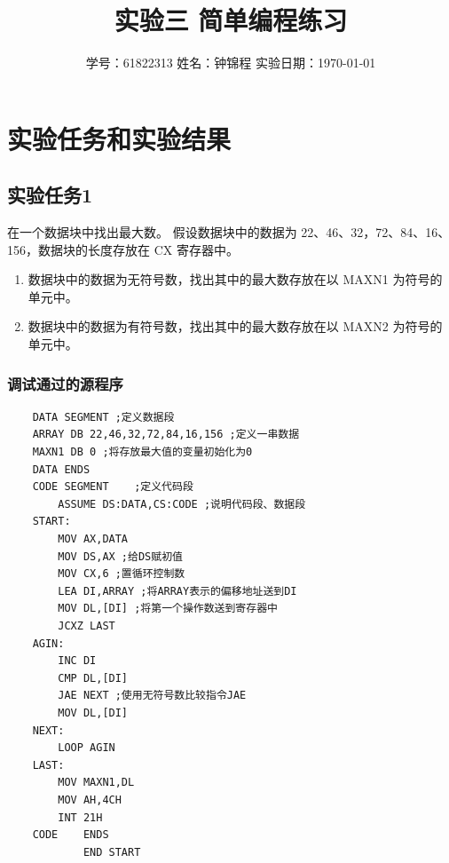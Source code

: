 \documentclass[12pt, a4paper, oneside]{ctexart}
\title{实验三 \qquad  简单编程练习}
\author{学号：61822313 \qquad 姓名：钟锦程 \qquad 实验日期：\today}
\date{}
\begin{document}
\maketitle
\section{实验任务和实验结果}
\subsection{实验任务1}
在一个数据块中找出最大数。 
假设数据块中的数据为 22、46、32，72、84、16、156，数据块的长度存放在 CX 寄存器中。
\begin{enumerate}
    \item 数据块中的数据为无符号数，找出其中的最大数存放在以 MAXN1 为符号的单元中。
    \item 数据块中的数据为有符号数，找出其中的最大数存放在以 MAXN2 为符号的单元中。 
\end{enumerate} 
\subsubsection{调试通过的源程序}
\begin{lstlisting}
    DATA SEGMENT ;定义数据段
    ARRAY DB 22,46,32,72,84,16,156 ;定义一串数据
    MAXN1 DB 0 ;将存放最大值的变量初始化为0 
    DATA ENDS
    CODE SEGMENT 	;定义代码段
        ASSUME DS:DATA,CS:CODE ;说明代码段、数据段
    START: 
        MOV AX,DATA 
        MOV DS,AX ;给DS赋初值
        MOV CX,6 ;置循环控制数
        LEA DI,ARRAY ;将ARRAY表示的偏移地址送到DI
        MOV DL,[DI] ;将第一个操作数送到寄存器中
        JCXZ LAST 
    AGIN:
        INC DI
        CMP DL,[DI]
        JAE NEXT ;使用无符号数比较指令JAE
        MOV DL,[DI]
    NEXT:
        LOOP AGIN
    LAST:
        MOV MAXN1,DL
        MOV AH,4CH
        INT 21H
    CODE 	ENDS
            END START
\end{lstlisting}
\end{document}

